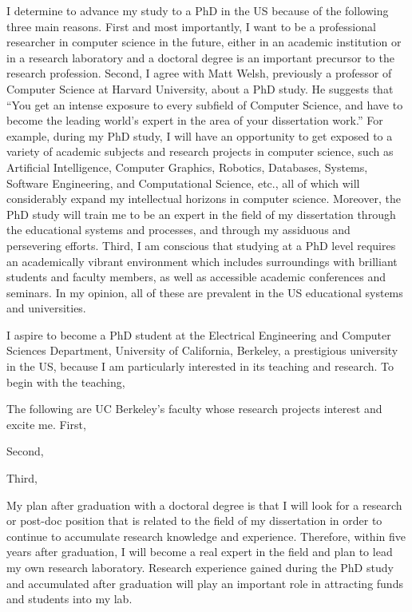 \documentclass[a4paper,10pt]{report}
\newcommand{\university}{University of California, Berkeley}
\newcommand{\department}{Electrical Engineering and Computer Sciences Department}
\newcommand{\uniabbre}{UC Berkeley}
\begin{document}
\vspace{0.2cm}
I determine to advance my study to a PhD in the US because of the following three main reasons. First and most importantly, I want to be a professional researcher in computer science in the future, either in an academic institution or in a research laboratory and a doctoral degree is an important precursor to the research profession. Second, I agree with Matt Welsh, previously a professor of Computer Science at Harvard University, about a PhD study. He suggests that ``You get an intense exposure to every subfield of Computer Science, and have to become the leading world's expert in the area of your dissertation work.'' For example, during my PhD study, I will have an opportunity to get exposed to a variety of academic subjects and research projects in computer science, such as Artificial Intelligence, Computer Graphics, Robotics, Databases, Systems, Software Engineering, and Computational Science, etc., all of which will considerably expand my intellectual horizons in computer science. Moreover, the PhD study will train me to be an expert in the field of my dissertation through the educational systems and processes, and through my assiduous and persevering efforts. Third, I am conscious that studying at a PhD level requires an academically vibrant environment which includes surroundings with brilliant students and faculty members, as well as accessible academic conferences and seminars. In my opinion, all of these are prevalent in the US educational systems and universities.

\vspace{0.2cm}
I aspire to become a PhD student at the \department, \university, a prestigious university in the US, because I am particularly interested in its teaching and research. To begin with the teaching, 

\vspace{0.2cm}
The following are \uniabbre's faculty whose research projects interest and excite me. First, 

\vspace{0.2cm}
Second, 

\vspace{0.2cm}
Third, 

\vspace{0.2cm}
My plan after graduation with a doctoral degree is that I will look for a research or post-doc position that is related to the field of my dissertation in order to continue to accumulate research knowledge and experience. Therefore, within five years after graduation, I will become a real expert in the field and plan to lead my own research laboratory. Research experience gained during the PhD study and accumulated after graduation will play an important role in attracting funds and students into my lab.
\end{document}
